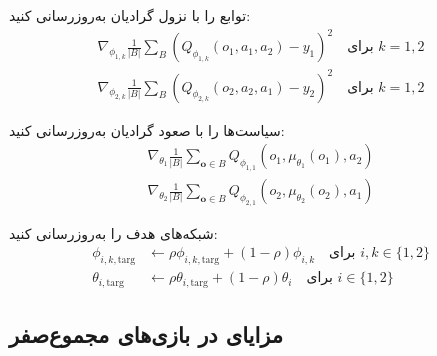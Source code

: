 \begin{algorithm}[H]
\begin{algorithmic}[1]
                    \State توابع  را با نزول گرادیان به‌روزرسانی کنید:
                    \vspace{-15pt}
                    \begin{align*}
                        \nabla_{\phi_{1,k}} \frac{1}{|B|}\sum_{B} \left( Q_{\phi_{1,k}}(o_1, a_1, a_2) - y_1 \right)^2 \quad \text{برای } k=1,2 \\
                        \nabla_{\phi_{2,k}} \frac{1}{|B|}\sum_{B} \left( Q_{\phi_{2,k}}(o_2, a_2, a_1) - y_2 \right)^2 \quad \text{برای } k=1,2
                    \end{align*}
                    \vspace{-30pt}
                    
                        \State سیاست‌ها را با صعود گرادیان به‌روزرسانی کنید:
                        \vspace{-15pt}
                        \begin{align*}
                            \nabla_{\theta_1} \frac{1}{|B|}\sum_{\boldsymbol{o} \in B}Q_{\phi_{1,1}}(o_1, \mu_{\theta_1}(o_1), a_2) \\
                            \nabla_{\theta_2} \frac{1}{|B|}\sum_{\boldsymbol{o} \in B}Q_{\phi_{2,1}}(o_2, \mu_{\theta_2}(o_2), a_1)
                        \end{align*}
                        \vspace{-35pt}
                        
                        \State شبکه‌های هدف را به‌روزرسانی کنید:
                        \vspace{-15pt}
                        \begin{align*}
                            \phi_{i,k,\text{targ}} &\leftarrow \rho \phi_{i,k,\text{targ}} + (1-\rho) \phi_{i,k} \quad \text{برای } i,k \in \{1,2\} \\
                            \theta_{i,\text{targ}} &\leftarrow \rho \theta_{i,\text{targ}} + (1-\rho) \theta_i \quad \text{برای } i \in \{1,2\}
                        \end{align*}
                    \EndIf
                \EndFor
            \EndIf
        \EndWhile
        \vspace{-15pt}
    \end{algorithmic}
\end{algorithm}

\subsection{مزایای  در بازی‌های مجموع­‌صفر}

